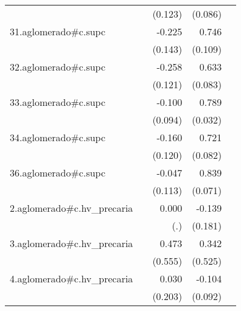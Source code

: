 {\begin{longtable}{l*{4}{D{.}{.}{-1}}}
            &                     &     (0.123)         &     (0.086)         &                     \\
\addlinespace
31.aglomerado#c.supc&                     &      -0.225         &       0.746\sym{***}&                     \\
            &                     &     (0.143)         &     (0.109)         &                     \\
\addlinespace
32.aglomerado#c.supc&                     &      -0.258\sym{*}  &       0.633\sym{***}&                     \\
            &                     &     (0.121)         &     (0.083)         &                     \\
\addlinespace
33.aglomerado#c.supc&                     &      -0.100         &       0.789\sym{***}&                     \\
            &                     &     (0.094)         &     (0.032)         &                     \\
\addlinespace
34.aglomerado#c.supc&                     &      -0.160         &       0.721\sym{***}&                     \\
            &                     &     (0.120)         &     (0.082)         &                     \\
\addlinespace
36.aglomerado#c.supc&                     &      -0.047         &       0.839\sym{***}&                     \\
            &                     &     (0.113)         &     (0.071)         &                     \\
\addlinespace
2.aglomerado#c.hv\_precaria&                     &       0.000         &      -0.139         &                     \\
            &                     &         (.)         &     (0.181)         &                     \\
\addlinespace
3.aglomerado#c.hv\_precaria&                     &       0.473         &       0.342         &                     \\
            &                     &     (0.555)         &     (0.525)         &                     \\
\addlinespace
4.aglomerado#c.hv\_precaria&                     &       0.030         &      -0.104         &                     \\
            &                     &     (0.203)         &     (0.092)         &                     \\

\end{longtable}}
